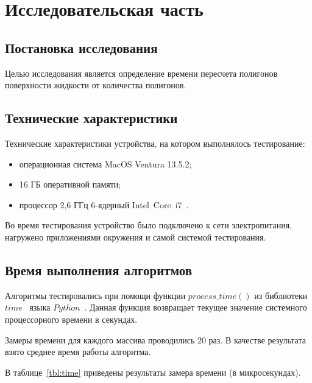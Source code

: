 \chapter{Исследовательская часть}

\section{Постановка исследования}

Целью исследования является определение времени пересчета полигонов поверхности жидкости от количества полигонов.


\section{Технические характеристики}

Технические характеристики устройства, на котором выполнялось тестирование:
\begin{itemize}[label={---}]
	\item операционная система MacOS Ventura 13.5.2;
	\item 16 ГБ оперативной памяти;
    \item процессор 2,6 ГГц 6‑ядерный Intel Core i7~\cite{intel}.

\end{itemize}

Во время тестирования устройство было подключено к сети электропитания, нагружено приложениями окружения и самой системой тестирования.

\section{Время выполнения алгоритмов}

Алгоритмы тестировались при помощи функции $process\_time()$ из библиотеки $time$~\cite{pythonlangtime} языка $Python$~\cite{python}. 
Данная функция возвращает текущее значение системного процессорного времени в секундах.

Замеры времени для каждого массива проводились 20 раз. 
В качестве результата взято среднее время работы алгоритма. 

В таблице~\ref{tbl:time} приведены результаты замера времени (в микросекундах). 


